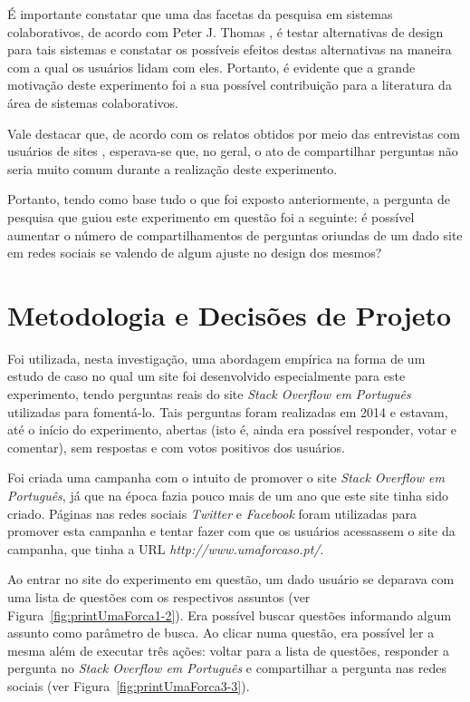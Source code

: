 É importante constatar que uma das facetas da pesquisa em sistemas colaborativos, de acordo com Peter J. Thomas \cite{Thomas:1996:CRE:524573}, é testar alternativas de design para tais sistemas e constatar os possíveis efeitos destas alternativas na maneira com a qual os usuários lidam com eles. Portanto, é evidente que a grande motivação deste experimento foi a sua possível contribuição para a literatura da área de sistemas colaborativos.

Vale destacar que, de acordo com os relatos obtidos por meio das entrevistas com usuários de sites \qa, esperava-se que, no geral, o ato de compartilhar perguntas não seria muito comum durante a realização deste experimento.

Portanto, tendo como base tudo o que foi exposto anteriormente, a pergunta de pesquisa que guiou este experimento em questão foi a seguinte: é possível aumentar o número de compartilhamentos de perguntas oriundas de um dado site \qa em redes sociais se valendo de algum ajuste no design dos mesmos?

\section{Metodologia e Decisões de Projeto}
Foi utilizada, nesta investigação, uma abordagem empírica na forma de um estudo de caso no qual um site \qa foi desenvolvido especialmente para este experimento, tendo perguntas reais do site \textit{Stack Overflow em Português} utilizadas para fomentá-lo. Tais perguntas foram realizadas em 2014 e estavam, até o início do experimento, abertas (isto é, ainda era possível responder, votar e comentar), sem respostas e com votos positivos dos usuários.

Foi criada uma campanha com o intuito de promover o site \textit{Stack Overflow em Português}, já que na época fazia pouco mais de um ano que este site tinha sido criado. Páginas nas redes sociais \textit{Twitter} e \textit{Facebook} foram utilizadas para promover esta campanha e tentar fazer com que os usuários acessassem o site da campanha, que tinha a URL \textit{http://www.umaforcaso.pt/}.

Ao entrar no site do experimento em questão, um dado usuário se deparava com uma lista de questões com os respectivos assuntos (ver Figura~\ref{fig:printUmaForca1-2}). Era possível buscar questões informando algum assunto como parâmetro de busca. Ao clicar numa questão, era possível ler a mesma além de executar três ações: voltar para a lista de questões, responder a pergunta no \textit{Stack Overflow em Português} e compartilhar a pergunta nas redes sociais (ver Figura~\ref{fig:printUmaForca3-3}).

